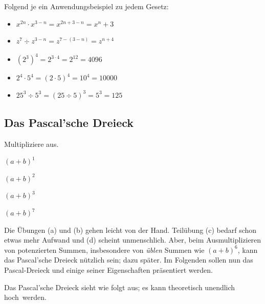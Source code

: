 \documentclass[%
11pt,%
twoside,%
titlepage,%
german,%
]{scrartcl}
\newcounter{theo}[section]\setcounter{theo}{0}
\begin{document}
\begin{bsps}
Folgend je ein Anwendungsbeispiel zu jedem Gesetz:
\begin{itemize}
\item $x^{2n}\cdot x^{3-n}=x^{2n+3-n}=x^n+3$
\item $z^7\div z^{3-n}=z^{7-(3-n)}=z^{n+4}$
\item $\left(2^3\right)^4=2^{3\cdot4}=2^{12}=4096$
\item $2^4\cdot5^4=(2\cdot5)^4=10^4=10000$
\item $25^3\div5^3=(25\div5)^3=5^3=125$
\end{itemize}
\end{bsps}

\subsection{Das Pascal'sche Dreieck}

\begin{ueb}[Binompotenzen]
Multipliziere aus.
  \\[2.5ex]\hspace*{2.7ex}
  \begin{minipage}{0.4\textwidth}
    \begin{enumeratea}
      \item $(a+b)^1$
      \item $(a+b)^2$\\[1ex]
    \end{enumeratea}
  \end{minipage}
  \begin{minipage}{0.23\textwidth}
    \begin{enumeratea}\addtocounter{enumi}{2}
      \item $(a+b)^3$
      \item $(a+b)^7$\\[1ex]
    \end{enumeratea}
  \end{minipage}
  \end{ueb}
  
Die Übungen (a) und (b) gehen leicht von der Hand. Teil\"ubung (c) bedarf schon etwas mehr Aufwand und (d) scheint unmenschlich. Aber, beim Ausmultiplizieren von potenzierten Summen, insbesondere von \emph{\"ublen} Summen wie $(a+b)^6$, kann das Pascal'sche Dreieck n\"utzlich sein; dazu sp\"ater. Im Folgenden sollen nun das Pascal-Dreieck und einige seiner Eigenschaften pr\"asentiert werden.

Das Pascal'sche Dreieck sieht wie folgt aus; es kann theoretisch unendlich \glqq hoch\grqq\ werden.
\end{document}
